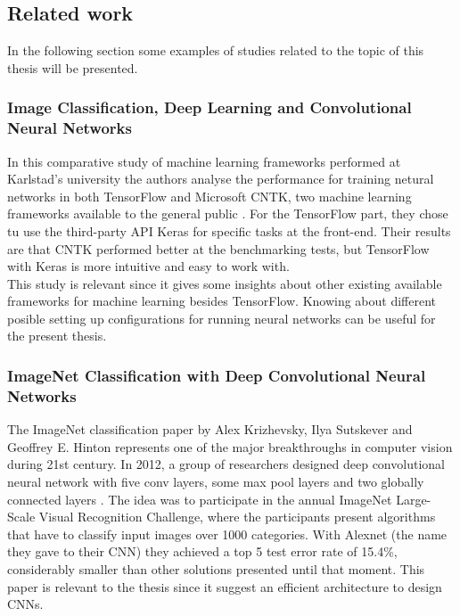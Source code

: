 \subsection{Related work}
In the following section some examples of studies related to the topic of this thesis will be presented.

\subsubsection{Image Classification, Deep Learning and Convolutional Neural Networks}
In this comparative study of machine learning frameworks performed at Karlstad's university the authors analyse the performance for training netural networks in both TensorFlow and Microsoft CNTK, two machine learning frameworks available to the general public \cite{airola2017}. For the TensorFlow part, they chose tu use the third-party API Keras for specific tasks at the front-end. Their results are that CNTK performed better at the benchmarking tests, but TensorFlow with Keras is more intuitive and easy to work with. \\
This study is relevant since it gives some insights about other existing available frameworks for machine learning besides TensorFlow. Knowing about different posible setting up configurations for running neural networks can be useful for the present thesis.

\subsubsection{ImageNet Classification with Deep Convolutional Neural Networks}
The ImageNet classification paper by Alex Krizhevsky, Ilya Sutskever and Geoffrey E. Hinton represents one of the major breakthroughs in computer vision during 21st century. In 2012, a group of researchers designed deep convolutional neural network with five conv layers, some max pool layers and two globally connected layers \cite{alexnet}. The idea was to participate in the annual ImageNet Large-Scale Visual Recognition Challenge, where the participants present algorithms that have to classify input images over 1000 categories. With Alexnet (the name they gave to their CNN) they achieved  a top 5 test error rate of 15.4\%, considerably smaller than other solutions presented until that moment. This paper is relevant to the thesis since it suggest an efficient architecture to design CNNs.

